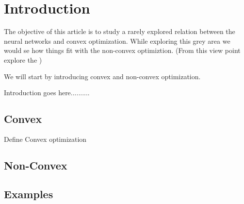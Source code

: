 \chapter{Introduction}

The objective of this article is to study a rarely explored relation between the neural networks and convex optimization.  While exploring this grey area we would se how things fit with the non-convex optimiztion. (From this view point explore the )

We will start by introducing convex and non-convex optimization. 


Introduction goes here..........
\section{Convex}

Define Convex optimization
\section{Non-Convex}

\section{Examples}

